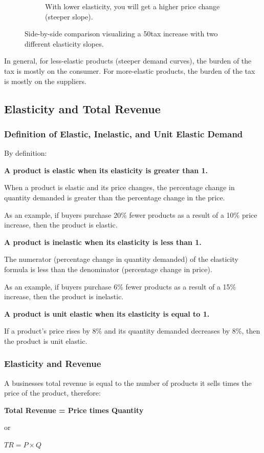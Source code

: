 \documentclass[a4paper, 12pt] {article}
\begin{document}
\begin{figure}[ht]
\begin{subfigure}{0.42\textwidth}
        \caption{With lower elasticity, you will get a higher price change 
        (steeper slope).}
        \label{fig:right_elas}
    \end{subfigure}
    \caption{Side-by-side comparison visualizing a 50\textcent \space tax
        increase with two different elasticity slopes.}
    \label{fig:combined}
\end{figure}
In general, for less-elastic products (steeper demand curves), the burden of the
tax is mostly on the consumer. For more-elastic products, the burden of the tax
is mostly on the suppliers.

\subsection{Elasticity and Total Revenue}
\subsubsection{Definition of Elastic, Inelastic, and Unit Elastic Demand}
By definition:
\begin{description}
    \item \textbf{A product is elastic when its elasticity is greater than 1.}

        When a product is elastic and its price changes, the percentage change
        in quantity demanded is greater than the percentage change in the price.

        As an example, if buyers purchase 20\% fewer products as a result of a
        10\% price increase, then the product is elastic.
    \item \textbf{A product is inelastic when its elasticity is less than 1.}

        The numerator (percentage change in quantity demanded) of the elasticity
        formula is less than the denominator (percentage change in price).

        As an example, if buyers purchase 6\% fewer products as a result of a 
        15\% increase, then the product is inelastic.
    \item \textbf{A product is unit elastic when its elasticity is equal to 1.}

        If a product's price rises by 8\% and its quantity demanded decreases by
        8\%, then the product is unit elastic.
\end{description}

\subsubsection{Elasticity and Revenue}
A businesses total revenue is equal to the number of products it sells times the
price of the product, therefore:
\begin{description}
    \item \textbf{Total Revenue = Price times Quantity}
    \item or
    \item \textbf{$TR = P \times Q$}
\end{description}
\end{document}
